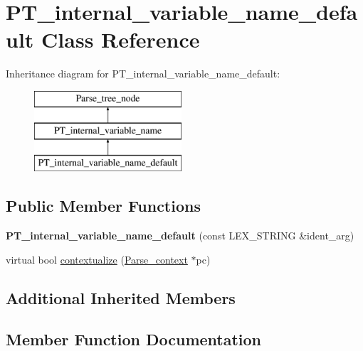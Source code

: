 \hypertarget{classPT__internal__variable__name__default}{}\section{P\+T\+\_\+internal\+\_\+variable\+\_\+name\+\_\+default Class Reference}
\label{classPT__internal__variable__name__default}
Inheritance diagram for P\+T\+\_\+internal\+\_\+variable\+\_\+name\+\_\+default\+:\begin{figure}[H]
\begin{center}
\leavevmode
\includegraphics[height=3.000000cm]{classPT__internal__variable__name__default}
\end{center}
\end{figure}
\subsection*{Public Member Functions}
\begin{DoxyCompactItemize}
\item 
\mbox{\label{classPT__internal__variable__name__default_a44d0c492ff337a274da0d8853e33a259}} 
{\bfseries P\+T\+\_\+internal\+\_\+variable\+\_\+name\+\_\+default} (const L\+E\+X\+\_\+\+S\+T\+R\+I\+NG \&ident\+\_\+arg)
\item 
virtual bool \mbox{\hyperlink{classPT__internal__variable__name__default_a70dbec6cbccf1052e838c296cc97f24a}{contextualize}} (\mbox{\hyperlink{structParse__context}{Parse\+\_\+context}} $\ast$pc)
\end{DoxyCompactItemize}
\subsection*{Additional Inherited Members}


\subsection{Member Function Documentation}
\mbox{\label{classPT__internal__variable__name__default_a70dbec6cbccf1052e838c296cc97f24a}} 
